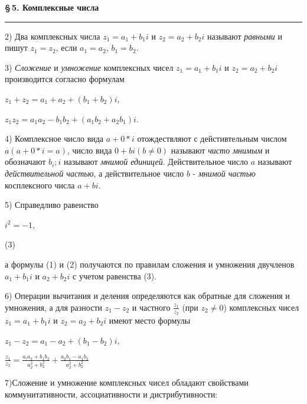 \documentclass[a5paper, 10pt]{book}
\begin{document}
    \begin{center}
    \textbf{\S\,5. Комплексные числа}
    \noindent\rule{\textwidth}{1pt}
    \end{center}
      \begin{spacing}
          \par2) Два комплексных числа $z_{1} = a_{1} + b_{1}i$ и $z_{2} = a_{2} + b_{2}i$ называют \textit{равными} и пишут $z_{1} = z_{2}$, если $a_{1} = a_{2}$, $b_{1} = b_{2}$.
          \par 3) \textit{Сложение} и \textit{умножение} комплексных чисел $z_{1} = a_{1} + b_{1}i$ и $z_{2} = a_{2} + b_{2}i$ производится согласно формулам
          \begin{center}
           $z_{1} + z_{2} = a_{1} + a_{2} + (b_{1} + b_{2})i$,
          \par $z_{1}z_{2} = a_{1}a_{2} - b_{1}b_{2} + (a_{1}b_{2} + a_{2}b_{1})i$.
           \end{center}
           \par 4) Комплексное число вида $a + 0*i$ отождествляют с дейстивтельным числом $a (a + 0*i = a)$, число вида $0 + bi (b \neq 0)$ называют \textit{чисто мнимым} и обозначают $b_{i}; i$ называют \textit{мнимой единицей}. Действительное число $a$ называют \textit{действительной частью}, а действительное число $b$ - \textit{мнимой частью} косплексного числа $a + bi$.
           \par 5) Справедливо равенство 
           \begin{center}
               $i^2 = -1$,  \begin{flushright} (3) \end{flushright}     
               \end{center}
           а формулы (1) и (2) получаются по правилам сложения и умножения двучленов $a_{1} + b_{1}i$ и $a_{2} + b_{2}i$ с учетом равенства (3).
           \par 6) Операции вычитания и деления определяются как обратные для сложения и умножения, а для разности $z_{1} - z_{2}$ и частного $\frac{z_{1}}{z_{2}}$ (при $z_{2} \neq 0$) комплексных чисел $z_{1} = a_{1} + b_{1}i$ и $z_{2} = a_{2} + b_{2}i$ имеют место формулы
           \begin{center}
               $z_{1} - z_{2} = a_{1} - a_{2} + (b_{1} - b_{2})i$,
               \par $\frac{z_{1}}{z_{2}} = \frac{a_{!}a_{2} + b_{1}b_{2}}{a^2_{2} + b^2_{2}} + \frac{a_{2}b_{1} - a_{1}b_{2}}{a^2_{2} + b^2_{2}}$
           \end{center}
               \par 7)Сложение и умножение комплексных чисел обладают свойствами коммунитативности, ассоциативности и дистрибутивности:

\end{spacing}
\end{document}
